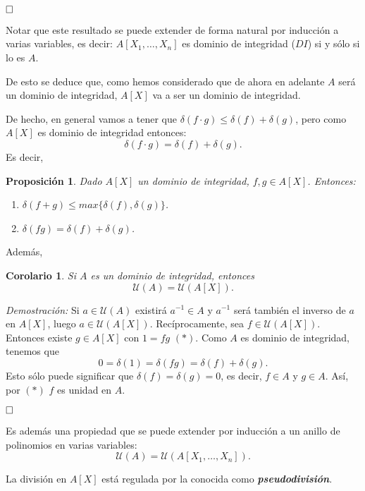\documentclass[12pt]{article}
\newtheorem{proposition}[theorem]{Proposición}
\newtheorem{corolario}{Corolario}[theorem]
\begin{document}
$\hfill \square$

Notar que este resultado se puede extender de forma natural por inducción a varias variables, es decir: $A[X_{1}, \ldots, X_{n}]$ es dominio de integridad ($DI$) si y sólo si lo es $A$.

De esto se deduce que, como hemos considerado que de ahora en adelante $A$ será un dominio de integridad, $A[X]$ va a ser un dominio de integridad.

De hecho, en general vamos a tener que $\delta(f \cdot g ) \leq \delta(f)+\delta(g)$, pero como $A[X]$ es dominio de integridad entonces: $$\delta(f\cdot g) =  \delta(f)+\delta(g).$$
Es decir, 

\begin{proposition}Dado $A[X]$ un dominio de integridad, $f,g \in A[X]$. Entonces: \begin{enumerate}
\item $\delta(f+g) \leq max\lbrace \delta(f), \delta(g) \rbrace$.
\item $\delta(fg) = \delta(f) + \delta(g)$.
\end{enumerate}
\end{proposition}

Además, 

\begin{corolario} Si $A$ es un dominio de integridad, entonces $$\mathcal{U}(A) = \mathcal{U}(A[X]).$$
\end{corolario}
\emph{Demostración: } Si $a \in \mathcal{U}(A)$ existirá $a^{-1} \in A$ y $a^{-1}$ será también el inverso de $a$ en $A[X]$, luego $a \in \mathcal{U}(A[X])$. Recíprocamente, sea $f \in \mathcal{U}(A[X])$. Entonces existe $g \in A[X]$ con $1 = fg$ $(\ast)$. Como $A$ es dominio de integridad, tenemos que $$0 = \delta (1) = \delta (fg) = \delta (f) + \delta (g).$$ Esto sólo puede significar que $\delta (f) = \delta (g) = 0$, es decir, $f \in A$ y $g \in A$. Así, por $(\ast)$ $f$ es unidad en $A$.

$\hfill \square$

Es además una propiedad que se puede extender por inducción a un anillo de polinomios en varias variables: $$\mathcal{U}(A) = \mathcal{U}(A[X_{1}, \ldots, X_{n}]).$$

La división en $A[X]$ está regulada por la conocida como \textbf{\textit{pseudodivisión}}.
\end{document}
